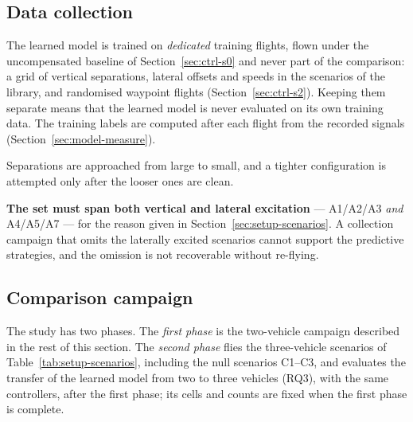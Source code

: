 \subsection{Data collection}
\label{sec:setup-collect}

The learned model is trained on \emph{dedicated} training flights, flown under the uncompensated
baseline of Section~\ref{sec:ctrl-s0} and never part of the comparison: a grid of vertical
separations, lateral offsets and speeds in the scenarios of the library, and randomised waypoint
flights (Section~\ref{sec:ctrl-s2}). Keeping them separate means that the learned model is never
evaluated on its own training data. The training labels are computed after each flight from the
recorded signals (Section~\ref{sec:model-measure}).

Separations are approached from large to small, and a tighter configuration is attempted only after
the looser ones are clean.

\textbf{The set must span both vertical and lateral excitation} --- A1/A2/A3 \emph{and} A4/A5/A7
--- for the reason given in Section~\ref{sec:setup-scenarios}. A collection campaign that omits the
laterally excited scenarios cannot support the predictive strategies, and the omission is not
recoverable without re-flying.

\subsection{Comparison campaign}
\label{sec:setup-campaign}

The study has two phases. The \emph{first phase} is the two-vehicle campaign described in the rest
of this section. The \emph{second phase} flies the three-vehicle scenarios of
Table~\ref{tab:setup-scenarios}, including the null scenarios C1--C3, and evaluates the transfer of
the learned model from two to three vehicles (RQ3), with the same controllers, after the first
phase; its cells and counts are fixed when the first phase is complete.

